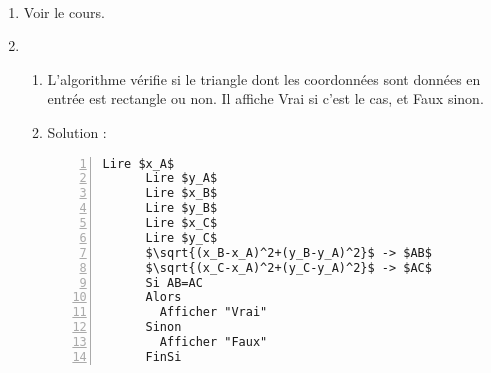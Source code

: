 \documentclass[11pt]{article}
\begin{document}
\begin{exercice}~
  \begin{enumerate}
    \item Voir le cours.
    \item \begin{enumerate}
    \item L'algorithme vérifie si le triangle dont les coordonnées sont données en entrée est rectangle ou non. Il affiche Vrai si c'est le cas, et Faux sinon.
    \item Solution :
      \begin{lstlisting}[language=naturel,frame=lines,mathescape=true,numbers=left]
      Lire $x_A$
      Lire $y_A$
      Lire $x_B$
      Lire $y_B$
      Lire $x_C$
      Lire $y_C$
      $\sqrt{(x_B-x_A)^2+(y_B-y_A)^2}$ -> $AB$
      $\sqrt{(x_C-x_A)^2+(y_C-y_A)^2}$ -> $AC$
      Si AB=AC
      Alors
        Afficher "Vrai"
      Sinon
        Afficher "Faux"
      FinSi
      \end{lstlisting}
      \end{enumerate}
  \end{enumerate}

\end{exercice}
\end{document}
